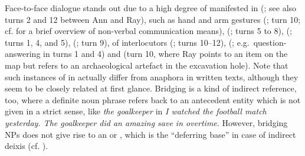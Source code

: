 \documentclass[output=paper
	        ,collection
	        ,collectionchapter
 	        ,biblatex
                ,babelshorthands
                ,newtxmath
                ,draftmode
                ,colorlinks, citecolor=brown
]{langscibook}
\begin{document}
Face-to-face dialogue stands out due to a high degree of  manifested in  (\citealt{Tomasello:1998}; see also turns 2 and 12 between Ann and Ray),  such as hand and arm gestures (\citealt{Kendon:2004,McNeill:2000:a}; turn 10; cf.  for a brief overview of non-verbal communication means),  (\citealp{Ginzburg:Fernandez:Schlangen:2014}; turns 5 to 8),  (\citealp{Fernandez:Ginzburg:2002,Fernandez:Ginzburg:Lappin:2007}; turns 1, 4, and 5),  (\citealp{Ginzburg:Breitholz:Cooper:Hough:Tian:2015}; turn 9),  of interlocutors (\citealp{Clark:Schreuder:Buttrick:1983}; turns 10--12),  (\citealp{Sacks:Schegloff:Jefferson:1974,heldner2010,levinson2015}; e.g.\ question-answering in turns 1 and 4) and  (turn 10, where Ray points to an item on the map but refers to an archaeological artefact in the excavation hole). Note that such instances of  \citep{Nunberg:1993} in  actually differ from  anaphora \citep{Clark:1975}  in written texts, although they seem to be closely related at first glance. Bridging is a kind of indirect reference, too, where a definite noun phrase refers back to an antecedent entity which is not given in a strict sense, like \textit{the goalkeeper} in \textit{I watched the football match yesterday. The goalkeeper did an amazing save in overtime}. However, bridging NPs does not give rise to an  or , which is the \enquote{deferring base} in case of indirect deixis (cf. \citealp{Luecking:2018:a}).
\end{document}
